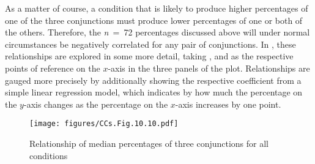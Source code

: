 As a matter of course, a condition that is likely to produce higher percentages of one of the three conjunctions must produce lower percentages of one or both of the others. Therefore, the \textit{n~}=~72 percentages discussed above will under normal circumstances be negatively correlated for any pair of conjunctions. In , these relationships are explored in some more detail, taking ,  and  as the respective points of reference on the $x$-axis in the three panels of the plot. Relationships are gauged more precisely by additionally showing the respective coefficient from a simple linear regression model, which indicates by how much the percentage on the $y$-axis changes as the percentage on the $x$-axis increases by one point.

\begin{figure}
\texttt{[image: figures/CCs.Fig.10.10.pdf]}
\caption{\label{bkm:Ref60442245}\label{fig:10.10}Relationship of median percentages of three conjunctions for all conditions}
\end{figure}


